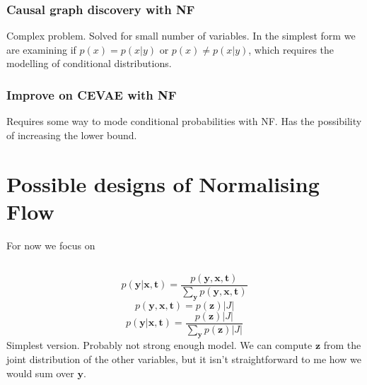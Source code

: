 \documentclass{article}
\newcommand{\bt}{\mathbf{t}}
\newcommand{\bx}{\mathbf{x}}
\newcommand{\by}{\mathbf{y}}
\newcommand{\bz}{\mathbf{z}}
\begin{document}
\subsubsection*{Causal graph discovery with NF}
Complex problem. Solved for small number of variables. In the simplest form we are examining if $p(x) = p(x|y)$ or $p(x) \neq p(x|y)$, which requires the modelling of conditional distributions.

\subsubsection*{Improve on CEVAE with NF}
Requires some way to mode conditional probabilities with NF. Has the possibility of increasing the lower bound.

\section*{Possible designs of Normalising Flow}
For now we focus on 
\subsection{}
\begin{equation}
    p(\by | \bx, \bt) = \frac{p(\by, \bx, \bt)}{\sum_\by p(\by, \bx, \bt)}
\end{equation}
\begin{equation}
    p(\by, \bx, \bt) = p(\bz) |J|
\end{equation}
\begin{equation}
    p(\by | \bx, \bt) = \frac{p(\bz)|J|}{\sum_\by p(\bz)|J|}
\end{equation}
Simplest version. Probably not strong enough model. We can compute $\bz$ from the joint distribution of the other variables, but it isn't straightforward to me how we would sum over $\by$.
\end{document}
